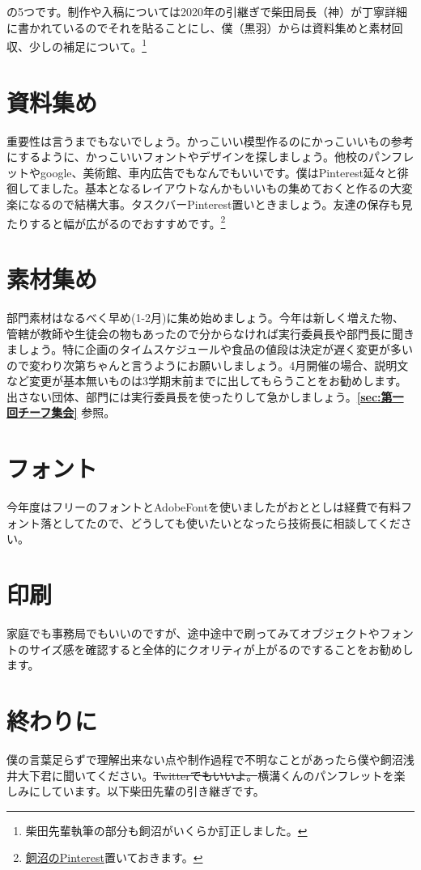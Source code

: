 \documentclass[a4paper]{ltjsreport}
\begin{document}
の5つです。制作や入稿については2020年の引継ぎで柴田局長（神）が丁寧詳細に書かれているのでそれを貼ることにし、僕（黒羽）からは資料集めと素材回収、少しの補足について。\footnote{柴田先輩執筆の部分も飼沼がいくらか訂正しました。}

\section{資料集め}
重要性は言うまでもないでしょう。かっこいい模型作るのにかっこいいもの参考にするように、かっこいいフォントやデザインを探しましょう。他校のパンフレットやgoogle、美術館、車内広告でもなんでもいいです。僕はPinterest延々と徘徊してました。基本となるレイアウトなんかもいいもの集めておくと作るの大変楽になるので結構大事。タスクバーPinterest置いときましょう。友達の保存も見たりすると幅が広がるのでおすすめです。\footnote{\href{https://www.pinterest.jp/mpse_}{飼沼のPinterest}置いておきます。}

\section{素材集め}
部門素材はなるべく早め(1-2月)に集め始めましょう。今年は新しく増えた物、管轄が教師や生徒会の物もあったので分からなければ実行委員長や部門長に聞きましょう。特に企画のタイムスケジュールや食品の値段は決定が遅く変更が多いので変わり次第ちゃんと言うようにお願いしましょう。4月開催の場合、説明文など変更が基本無いものは3学期末前までに出してもらうことをお勧めします。出さない団体、部門には実行委員長を使ったりして急かしましょう。{\bfseries \ref{sec:第一回チーフ集会}} 参照。

\section{フォント}
今年度はフリーのフォントとAdobeFontを使いましたがおととしは経費で有料フォント落としてたので、どうしても使いたいとなったら技術長に相談してください。

\section{印刷}
家庭でも事務局でもいいのですが、途中途中で刷ってみてオブジェクトやフォントのサイズ感を確認すると全体的にクオリティが上がるのですることをお勧めします。

\section{終わりに}
僕の言葉足らずで理解出来ない点や制作過程で不明なことがあったら僕や飼沼浅井大下君に聞いてください。\sout{Twitterでもいいよ。}横溝くんのパンフレットを楽しみにしています。以下柴田先輩の引き継ぎです。
\end{document}

